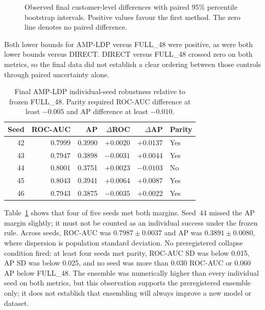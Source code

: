 \begin{figure}[t]
\centering

\caption{Observed final customer-level differences with paired 95\% percentile bootstrap intervals. Positive values favour the first method. The zero line denotes no paired difference.}
\label{fig:final-paired-effects}
\end{figure}

Both lower bounds for AMP-LDP versus FULL\_48 were positive, as were both lower bounds versus DIRECT. DIRECT versus FULL\_48 crossed zero on both metrics, so the final data did not establish a clear ordering between those controls through paired uncertainty alone.

\begin{table}[t]
\caption{Final AMP-LDP individual-seed robustness relative to frozen FULL\_48. Parity required ROC-AUC difference at least $-0.005$ and AP difference at least $-0.010$.}
\label{tab:final-seed-robustness}
\centering
\small
\begin{tabular}{@{}rrrrrl@{}}
\toprule
Seed & ROC-AUC & AP & $\Delta$ROC & $\Delta$AP & Parity \\
\midrule
42 & 0.7999 & 0.3990 & +0.0020 & +0.0137 & Yes \\
43 & 0.7947 & 0.3898 & $-0.0031$ & +0.0044 & Yes \\
44 & 0.8001 & 0.3751 & +0.0023 & $-0.0103$ & No \\
45 & 0.8043 & 0.3941 & +0.0064 & +0.0087 & Yes \\
46 & 0.7943 & 0.3875 & $-0.0035$ & +0.0022 & Yes \\
\bottomrule
\end{tabular}
\end{table}

Table~\ref{tab:final-seed-robustness} shows that four of five seeds met both margins. Seed~44 missed the AP margin slightly; it must not be counted as an individual success under the frozen rule. Across seeds, ROC-AUC was $0.7987\pm0.0037$ and AP was $0.3891\pm0.0080$, where dispersion is population standard deviation. No preregistered collapse condition fired: at least four seeds met parity, ROC-AUC SD was below 0.015, AP SD was below 0.025, and no seed was more than 0.030 ROC-AUC or 0.060 AP below FULL\_48. The ensemble was numerically higher than every individual seed on both metrics, but this observation supports the preregistered ensemble only; it does not establish that ensembling will always improve a new model or dataset.

